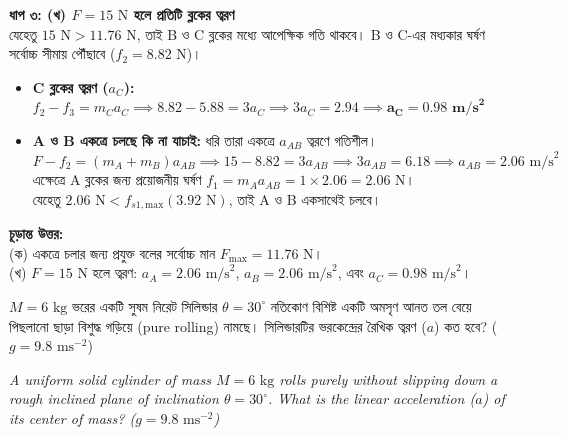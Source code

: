 \documentclass[12pt, a4paper]{article}
\begin{document}
\begin{tcolorbox}[solutionbox={সমাধান (Solution) }]
\vspace{0.5em}
\noindent
\textbf{ধাপ ৩: (খ) $F = 15\text{ N}$ হলে প্রতিটি ব্লকের ত্বরণ} \\
যেহেতু $15\text{ N} > 11.76\text{ N}$, তাই B ও C ব্লকের মধ্যে আপেক্ষিক গতি থাকবে। B ও C-এর মধ্যকার ঘর্ষণ সর্বোচ্চ সীমায় পৌঁছাবে ($f_2 = 8.82\text{ N}$)।
\begin{itemize}[leftmargin=*, parsep=0.5ex]
    \item \textbf{C ব্লকের ত্বরণ ($a_C$):} $f_2 - f_3 = m_C a_C \implies 8.82 - 5.88 = 3a_C \implies 3a_C = 2.94 \implies \mathbf{a_C = 0.98\text{ m/s}^2}$
    \item \textbf{A ও B একত্রে চলছে কি না যাচাই:} ধরি তারা একত্রে $a_{AB}$ ত্বরণে গতিশীল। \\
    $F - f_2 = (m_A + m_B)a_{AB} \implies 15 - 8.82 = 3a_{AB} \implies 3a_{AB} = 6.18 \implies a_{AB} = 2.06\text{ m/s}^2$ \\
    এক্ষেত্রে A ব্লকের জন্য প্রয়োজনীয় ঘর্ষণ $f_1 = m_A a_{AB} = 1 \times 2.06 = 2.06\text{ N}$। \\
    যেহেতু $2.06\text{ N} < f_{s1,\text{max}} (3.92\text{ N})$, তাই A ও B একসাথেই চলবে। 
\end{itemize}

\vspace{1em}
\begin{tcolorbox}[answerbox]
\textbf{চূড়ান্ত উত্তর:} \\
(ক) একত্রে চলার জন্য প্রযুক্ত বলের সর্বোচ্চ মান $F_{\text{max}} = 11.76\text{ N}$। \\
(খ) $F = 15\text{ N}$ হলে ত্বরণ: $a_A = 2.06\text{ m/s}^2$, $a_B = 2.06\text{ m/s}^2$, এবং $a_C = 0.98\text{ m/s}^2$।
\end{tcolorbox}
\end{tcolorbox}

\vspace{2em}

\begin{tcolorbox}[questionbox={প্রশ্ন (Question) 4}]
\noindent
$M = 6\text{ kg}$ ভরের একটি সুষম নিরেট সিলিন্ডার $\theta = 30^\circ$ নতিকোণ বিশিষ্ট একটি অমসৃণ আনত তল বেয়ে পিছলানো ছাড়া বিশুদ্ধ গড়িয়ে (pure rolling) নামছে। সিলিন্ডারটির ভরকেন্দ্রের রৈখিক ত্বরণ ($a$) কত হবে? ($g = 9.8\text{ ms}^{-2}$)

\vspace{0.8em}
\begin{english}
\noindent\textit{\color{darkgray}
A uniform solid cylinder of mass $M = 6\text{ kg}$ rolls purely without slipping down a rough inclined plane of inclination $\theta = 30^\circ$. What is the linear acceleration ($a$) of its center of mass? ($g = 9.8\text{ ms}^{-2}$)
}
\end{english}
\end{tcolorbox}
\end{document}
